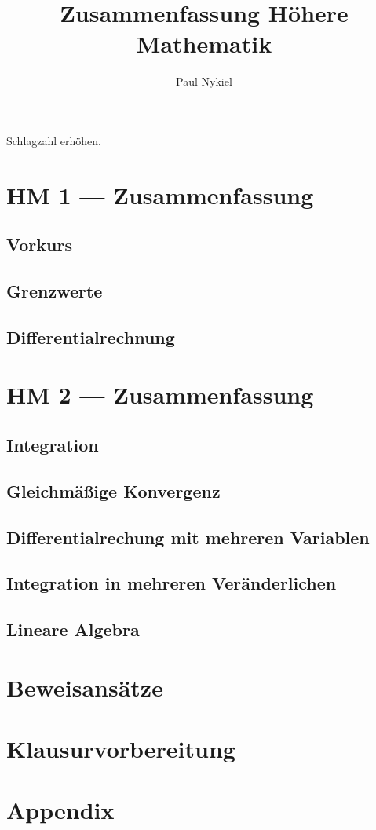 \documentclass[10pt]{report}
\title{Zusammenfassung Höhere Mathematik}
\author{Paul Nykiel}
\begin{document}
    \maketitle
    \pagebreak
    Schlagzahl erhöhen.
    \pagebreak
    \tableofcontents
    \pagebreak

    \part{HM 1 --- Zusammenfassung}
    \chapter{Vorkurs}
    

    \chapter{Grenzwerte}
    

    \chapter{Differentialrechnung}
    

    \part{HM 2 --- Zusammenfassung}
    \chapter{Integration}
    

    \chapter{Gleichmäßige Konvergenz}
    

    \chapter{Differentialrechung mit mehreren Variablen}
    

    \chapter{Integration in mehreren Veränderlichen}
    

    \chapter{Lineare Algebra}
    

    \part{Beweisansätze}
    

    \part{Klausurvorbereitung}
    

    \part{Appendix}
    
\end{document}
